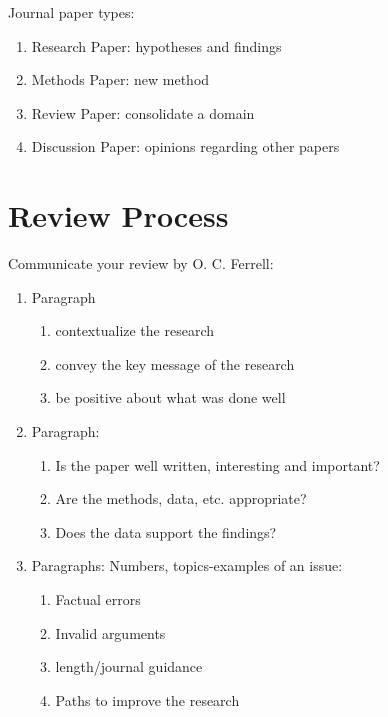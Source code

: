 \documentclass[
]{book}
\providecommand{\tightlist}{%
  \setlength{\itemsep}{0pt}\setlength{\parskip}{0pt}}
\begin{document}
Journal paper types:

\begin{enumerate}
\def\labelenumi{\arabic{enumi}.}
\tightlist
\item
  Research Paper: hypotheses and findings
\item
  Methods Paper: new method
\item
  Review Paper: consolidate a domain
\item
  Discussion Paper: opinions regarding other papers
\end{enumerate}

\hypertarget{review-process}{%
\chapter{Review Process}\label{review-process}}

Communicate your review by O. C. Ferrell:

\begin{enumerate}
\def\labelenumi{\arabic{enumi}.}
\item
  Paragraph

  \begin{enumerate}
  \def\labelenumii{\arabic{enumii}.}
  \item
    contextualize the research
  \item
    convey the key message of the research
  \item
    be positive about what was done well
  \end{enumerate}
\item
  Paragraph:

  \begin{enumerate}
  \def\labelenumii{\arabic{enumii}.}
  \item
    Is the paper well written, interesting and important?
  \item
    Are the methods, data, etc. appropriate?
  \item
    Does the data support the findings?
  \end{enumerate}
\item
  Paragraphs: Numbers, topics-examples of an issue:

  \begin{enumerate}
  \def\labelenumii{\arabic{enumii}.}
  \item
    Factual errors
  \item
    Invalid arguments
  \item
    length/journal guidance
  \item
    Paths to improve the research
  \end{enumerate}
\end{enumerate}
\end{document}
